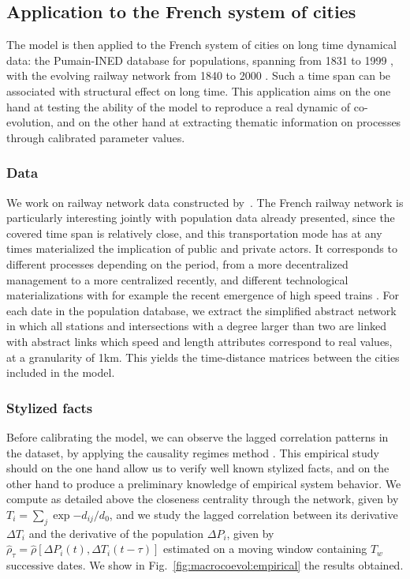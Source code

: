 \subsection{Application to the French system of cities}


The model is then applied to the French system of cities on long time dynamical data: the Pumain-INED database for populations, spanning from 1831 to 1999 \citep{pumain1986fichier}, with the evolving railway network from 1840 to 2000 \citep{thevenin2013mapping}. Such a time span can be associated with structural effect on long time. This application aims on the one hand at testing the ability of the model to reproduce a real dynamic of co-evolution, and on the other hand at extracting thematic information on processes through calibrated parameter values.

\subsubsection{Data}

We work on railway network data constructed by~\cite{thevenin2013mapping}. The French railway network is particularly interesting jointly with population data already presented, since the covered time span is relatively close, and this transportation mode has at any times materialized the implication of public and private actors. It corresponds to different processes depending on the period, from a more decentralized management to a more centralized recently, and different technological materializations with for example the recent emergence of high speed trains \citep{zembri1997fondements}. For each date in the population database, we extract the simplified abstract network in which all stations and intersections with a degree larger than two are linked with abstract links which speed and length attributes correspond to real values, at a granularity of 1km. This yields the time-distance matrices between the cities included in the model.



\subsubsection{Stylized facts}


Before calibrating the model, we can observe the lagged correlation patterns in the dataset, by applying the causality regimes method \citep{raimbault2017identification}. This empirical study should on the one hand allow us to verify well known stylized facts, and on the other hand to produce a preliminary knowledge of empirical system behavior. We compute as detailed above the closeness centrality through the network, given by $T_i = \sum_j \exp{-d_{ij}/d_0}$, and we study the lagged correlation between its derivative $\Delta T_i$ and the derivative of the population $\Delta P_i$, given by $\hat{\rho}_{\tau} = \hat{\rho}\left[\Delta P_i(t),\Delta T_i(t-\tau)\right]$ estimated on a moving window containing $T_w$ successive dates. We show in Fig.~\ref{fig:macrocoevol:empirical} the results obtained.


